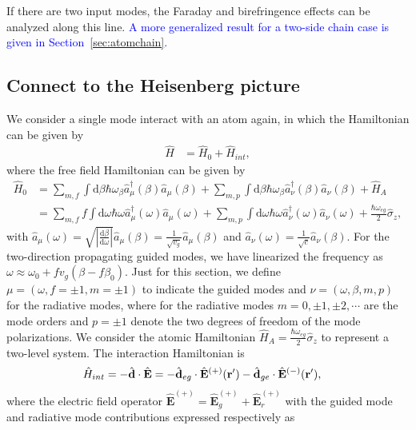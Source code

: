 \documentclass[preprint,aps,pra,onecolumn]{revtex4-1} %
\begin{document}
If there are two input modes, the Faraday and birefringence effects can be analyzed along this line. 
\textcolor{blue}{A more generalized result for a two-side chain case is given in 
Section~\ref{sec:atomchain}.}


\subsection{Connect to the Heisenberg picture}
We consider a single mode interact with an atom again, in which the Hamiltonian can be given by
\begin{align}
\hat{H} &= \hat{H}_0 + \hat{H}_{int}, 
\end{align}
where the free field Hamiltonian can be given by
\begin{align}
\hat{H}_0 &= \sum_{m,f} \int \mathrm{d}\beta \hbar \omega_{\beta} \hat{a}^\dagger_\mu(\beta)\hat{a}_\mu (\beta) +\sum_{m,p} \int \mathrm{d}\beta \hbar \omega_{\beta} \hat{a}^\dagger_\nu(\beta)\hat{a}_\nu (\beta)+ \hat{H}_A \\
&= \sum_{m,f} f\int \mathrm{d}\omega \hbar \omega \hat{a}^\dagger_\mu(\omega)\hat{a}_\mu (\omega) +\sum_{m,p} \int \mathrm{d}\omega \hbar \omega \hat{a}^\dagger_\nu(\omega)\hat{a}_\nu (\omega)+ \frac{\hbar\omega_{eg}}{2}\hat{\sigma}_z,
\end{align}
with $\hat{a}_\mu (\omega)= \sqrt{\left| \frac{\mathrm{d}\beta}{\mathrm{d}\omega}\right| }\hat{a}_\mu (\beta)=\frac{1}{\sqrt{v_g}}\hat{a}_\mu (\beta)$ and $\hat{a}_\nu (\omega)=  \frac{1}{\sqrt{c}}\hat{a}_\nu (\beta)$. For the two-direction propagating guided modes, we have linearized the frequency as $\omega\approx \omega_0+fv_g(\beta-f\beta_0)$. Just for this section, we define $\mu=(\omega,f=\pm 1,m=\pm 1)$ to indicate the guided modes and $\nu=(\omega,\beta,m,p)$ for the radiative modes, where for the radiative modes $m=0,\pm 1,\pm 2,\cdots$ are the mode orders and $p=\pm 1$ denote the two degrees of freedom of the mode polarizations.  We consider the atomic Hamiltonian $\hat{H}_A = \frac{\hbar\omega_{eg}}{2}\hat{\sigma}_z$ to represent a two-level system. The interaction Hamiltonian is
\begin{align}
\hat{H}_{int} &= -\hat{\mathbf{d}}\cdot \hat{\mathbf{E}}=-\hat{\mathbf{d}}_{eg}\cdot \hat{\mathbf{E}}^{(+)}(\mathbf{r}')-\hat{\mathbf{d}}_{ge}\cdot \hat{\mathbf{E}}^{(-)}(\mathbf{r}'),
\end{align}
where the electric field operator $\hat{\mathbf{E}}^{(+)}=\hat{\mathbf{E}}_g^{(+)}+\hat{\mathbf{E}}_{r}^{(+)}$ with  the guided mode and radiative mode contributions expressed respectively as 
\end{document}
